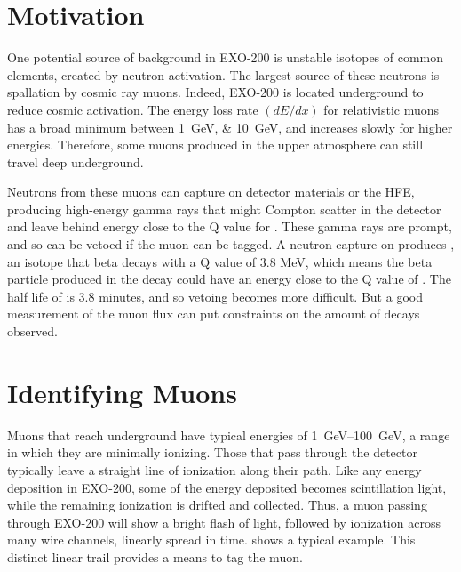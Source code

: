 \documentclass[herrin-thesis.tex]{subfiles}
\begin{document}
\section{Motivation}
\label{sec:muon:motivation}
One potential source of background in EXO-200 is unstable isotopes of common elements, created by neutron activation. The largest source of these neutrons is spallation by cosmic ray muons. Indeed, EXO-200 is located underground to reduce cosmic activation. The energy loss rate \((d E/d x)\) for relativistic muons has a broad minimum between \SIlist{1;10}{\GeV}, and increases slowly for higher energies. Therefore, some muons produced in the upper atmosphere can still travel deep underground.

Neutrons from these muons can capture on detector materials or the HFE, producing high-energy gamma rays that might Compton scatter in the detector and leave behind energy close to the Q value for . These gamma rays are prompt, and so can be vetoed if the muon can be tagged. A neutron capture on  produces , an isotope that beta decays with a Q value of 3.8 MeV, which means the beta particle produced in the decay could have an energy close to the Q value of . The half life of  is 3.8 minutes, and so vetoing becomes more difficult. But a good measurement of the muon flux can put constraints on the amount of  decays observed.

\section{Identifying Muons}
\label{sec:muon:id}
Muons that reach underground have typical energies of \SIrange{1}{100}{\GeV}, a range in which they are minimally ionizing. Those that pass through the detector typically leave a straight line of ionization along their path. Like any energy deposition in EXO-200, some of the energy deposited becomes scintillation light, while the remaining ionization is drifted and collected. Thus, a muon passing through EXO-200 will show a bright flash of light, followed by ionization across many wire channels, linearly spread in time.  shows a typical example. This distinct linear trail provides a means to tag the muon.
\end{document}
